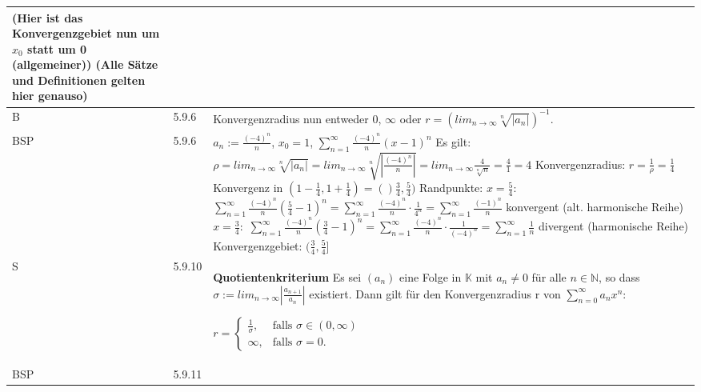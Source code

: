 \begin{longtable}{p{0.75cm} p{1cm} p{16cm}}
                        (Hier ist das Konvergenzgebiet nun um $x_0$ statt um 0 (allgemeiner)) \hfill \break
                        (Alle Sätze und Definitionen gelten hier genauso) \\
        \midrule
        B   & 5.9.6 &   Konvergenzradius nun entweder $0$, $\infty$ oder $r = (lim_{n \rightarrow \infty} \sqrt[n]{|a_n|})^{-1}$. \\
        \midrule
        BSP & 5.9.6 &   $a_n := \frac{(-4)^n}{n}$, $x_0 = 1$, $\sum^{\infty}_{n=1} \frac{(-4)^n}{n}(x-1)^n$ \hfill \break
                        Es gilt: $\rho = lim_{n \rightarrow \infty} \sqrt[n]{|a_n|} = lim_{n \rightarrow \infty} \sqrt[n]{|\frac{(-4)^n}{n}|} =
                        lim_{n \rightarrow \infty} \frac{4}{\sqrt[n]{n}} = \frac{4}{1} = 4$ \hfill \break 
                        Konvergenzradius: $r = \frac{1}{\rho} = \frac{1}{4}$ \hfill \break
                        Konvergenz in $(1- \frac{1}{4}, 1 + \frac{1}{4}) = ()\frac{3}{4}, \frac{5}{4})$ \hfill \break
                        Randpunkte: \hfill \break
                        $x = \frac{5}{4}:$ $\sum^{\infty}_{n=1} \frac{(-4)^n}{n}(\frac{5}{4}-1)^n = \sum^{\infty}_{n=1} \frac{(-4)^n}{n} \cdot \frac{1}{4^n}
                        = \sum^{\infty}_{n=1} \frac{(-1)^n}{n}$ konvergent (alt. harmonische Reihe)
                        $x = \frac{3}{4}:$ $\sum^{\infty}_{n=1} \frac{(-4)^n}{n}(\frac{3}{4}-1)^n = \sum^{\infty}_{n=1} \frac{(-4)^n}{n} \cdot \frac{1}{(-4)^n}
                        = \sum^{\infty}_{n=1} \frac{1}{n}$ divergent (harmonische Reihe) \hfill \break
                        Konvergenzgebiet: $(\frac{3}{4}, \frac{5}{4}]$\\
        \midrule
        S   & 5.9.10&   \textbf{Quotientenkriterium} \hfill \break
                    Es sei $(a_n)$ eine Folge in $\mathbb{K}$ mit $a_n \neq 0$ für alle $n \in \mathbb{N}$, so dass $\sigma := lim_{n \rightarrow \infty}
                    |\frac{a_{n+1}}{a_n}|$ existiert. Dann gilt für den Konvergenzradius r von $\sum^{\infty}_{n=0} a_n x^n$: \hfill \break
                    \centerline{$r =    \begin{cases}
                                        \frac{1}{\sigma}, & \text{falls } \sigma \in (0,\infty) \\
                                        \infty, & \text{falls } \sigma = 0.
                                        \end{cases}$} \\
        \midrule
        BSP & 5.9.11&   \begin{itemize}[topsep=-0.5cm]

\end{itemize}
\end{longtable}
